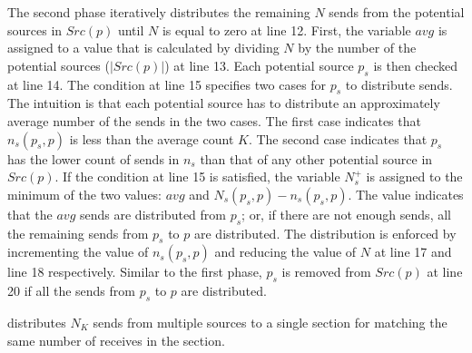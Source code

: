 The second phase iteratively distributes the remaining $N$ sends from the potential sources in $Src(p)$ until $N$ is equal to zero at line 12. 
First, the variable $avg$ is assigned to a value that is calculated by dividing $N$ by the number of the potential sources ($|Src(p)|$) at line 13. 
Each potential source $p_{s}$ is then checked at line 14. 
The condition at line 15 specifies two cases for $p_{s}$ to distribute sends. The intuition is that each potential source has to distribute an approximately average number of the sends in the two cases. The first case indicates that $n_s(p_{s},p)$ is less than the average count $K$. The second case indicates that $p_{s}$ has the lower count of sends in $n_s$ than that of any other potential source in $Src(p)$. 
If the condition at line 15 is satisfied, the variable $N_s^+$ is assigned to the minimum of the two values: $avg$ and $N_s(p_{s},p)-\mathit{n_s}(p_{s},p)$. The value indicates that the $avg$ sends are distributed from $p_s$; or, if there are not enough sends, all the remaining sends from $p_{s}$ to $p$ are distributed.  
The distribution is enforced by incrementing the value of $n_s(p_{s},p)$ and reducing the value of $N$ at line 17 and line 18 respectively. Similar to the first phase, $p_{s}$ is removed from $Src(p)$ at line 20 if all the sends from $p_{s}$ to $p$ are distributed.  

\begin{lemma}
 distributes $N_K$ sends from multiple sources to a single section for matching the same number of receives in the section.
\end{lemma}

